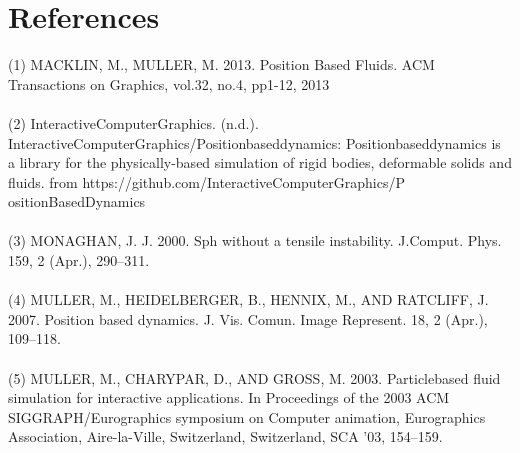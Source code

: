 \documentclass[sigconf]{acmart}
\begin{document}
\section{References}
(1) MACKLIN, M., MULLER, M. 2013. Position Based Fluids. ACM Transactions on Graphics, vol.32, no.4, pp1-12, 2013\\\\
(2) InteractiveComputerGraphics. (n.d.). InteractiveComputerGraphics/Positionbaseddynamics: Positionbaseddynamics is a library for the physically-based simulation of rigid bodies, deformable solids and fluids. from https://github.com/InteractiveComputerGraphics/P\\ositionBasedDynamics\\\\
(3) MONAGHAN, J. J. 2000. Sph without a tensile instability. J.Comput. Phys. 159, 2 (Apr.), 290–311.\\\\
(4) MULLER, M., HEIDELBERGER, B., HENNIX, M., AND RATCLIFF, J. 2007. Position based dynamics. J. Vis. Comun. Image Represent. 18, 2 (Apr.), 109–118.\\\\
(5) MULLER, M., CHARYPAR, D., AND GROSS, M. 2003. Particlebased fluid simulation for interactive applications. In Proceedings of the 2003 ACM SIGGRAPH/Eurographics symposium on Computer animation, Eurographics Association, Aire-la-Ville, Switzerland, Switzerland, SCA ’03, 154–159.
\end{document}
